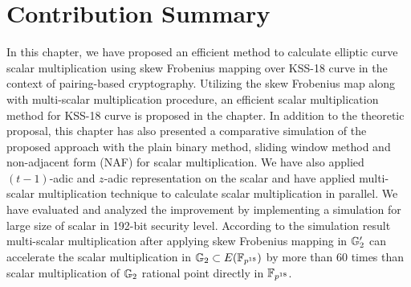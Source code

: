 \section{Contribution Summary}
In this chapter, we have proposed an efficient method to calculate elliptic curve scalar multiplication using skew Frobenius mapping  over KSS-18 curve in the context of pairing-based cryptography. 
Utilizing the skew Frobenius map along with multi-scalar multiplication procedure, an efficient scalar multiplication method for KSS-18 curve is proposed in the chapter.
In addition to the theoretic proposal, this chapter has also presented a comparative simulation of the proposed approach with the plain binary method, sliding window method and non-adjacent form (NAF) for scalar multiplication. 
We have also applied $(t-1)$-adic and $z$-adic representation on the scalar and have applied multi-scalar multiplication technique to  calculate scalar multiplication in parallel. 
We have evaluated and analyzed the improvement by implementing a simulation for large size of scalar in 192-bit security level. 
According to the simulation result multi-scalar multiplication after applying skew Frobenius mapping in ${\mathbb{G}}_{2}'$ can accelerate the scalar multiplication in ${\mathbb{G}}_{2} \subset E(\mathbb{F}_{p^{18}})$ by more than 60 times than scalar multiplication of ${\mathbb{G}}_{2}$ rational point directly in $\mathbb{F}_{p^{18}}$. 


